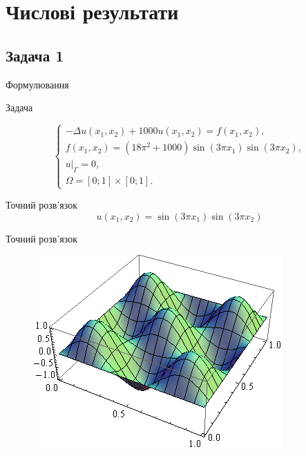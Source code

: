 
\section{Числові результати}
\frame{\sectionpage}
\subsection{Задача 1}
\frame{\subsectionpage}
\begin{frame}{Формулювання}

		Задача

		\begin{equation}\label{eq:problem1}
		\begin{cases}
			- \Delta u(x_1,x_2) + 1000u(x_1, x_2) = f(x_1,x_2), \\
			f(x_1,x_2) = (18 \pi^2 +1000)\sin(3 \pi x_1) \sin (3 \pi x_2), \\
			u|_\Gamma = 0 ,\\
			\Omega = \left[0;1\right] \times \left[0;1\right].
		\end{cases}
		\end{equation}

		Точний розв'язок
		\begin{equation}
			u(x_1,x_2) = \sin(3 \pi x_1) \sin (3 \pi x_2)
		\end{equation}

\end{frame}

\begin{frame}{Точний розв'язок}
		\begin{figure}[H]
			\centering
		    \includegraphics[scale=0.6]{problem1/ExactSolution}
		    \label{plot:problem1_exact}
		\end{figure}
\end{frame}

